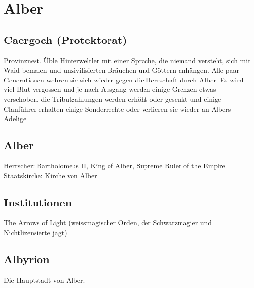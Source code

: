 \documentclass[10pt,twoside,twocolumn,openany]{book}
\begin{document}
\newpage \section{Alber}
\begin{multicols}{2}
	
	\subsection{Caergoch (Protektorat)}
	Provinznest. Üble Hinterweltler mit einer Sprache, die niemand versteht, sich mit Waid bemalen und unzivilisierten Bräuchen und Göttern anhängen. Alle paar Generationen wehren sie sich wieder gegen die Herrschaft durch Alber. Es wird viel Blut vergossen und je nach Ausgang werden einige Grenzen etwas verschoben, die Tributzahlungen werden erhöht oder gesenkt und einige Clanführer erhalten einige Sonderrechte oder verlieren sie wieder an Albers Adelige
	
	\subsection{Alber}
	Herrscher: Bartholomeus II, King of Alber, Supreme Ruler of the Empire
	Staatskirche: Kirche von Alber
	
	\subsection{Institutionen} The Arrows of Light (weissmagischer Orden, der Schwarzmagier und Nichtlizensierte jagt)
	
	
	
	
	
	\subsection{Albyrion}
	Die Hauptstadt von Alber.
\end{multicols}







\end{document}
